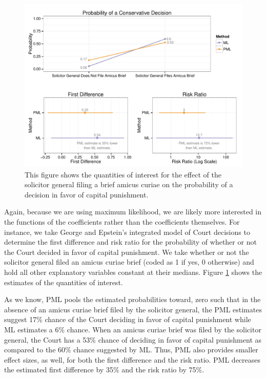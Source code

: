 \documentclass[12pt]{article}
\begin{document}
\begin{figure}[H]
\begin{center}
\includegraphics[width = \textwidth]{figs/ge-qis.pdf}
\caption{This figure shows the quantities of interest for the effect of the solicitor general filing a brief amicus curiae on the probability of a decision in favor of capital punishment.}\label{fig:ge-qis}
\end{center}
\end{figure}

Again, because we are using maximum likelihood, we are likely more interested in the functions of the coefficients rather than the coefficients themselves. 
For instance, we take George and Epstein's integrated model of Court decisions to determine the first difference and risk ratio for the probability of whether or not the Court decided in favor of capital punishment. 
We take whether or not the solicitor general filed an amicus curiae brief (coded as 1 if yes, 0 otherwise) and hold all other explanatory variables constant at their medians. 
Figure \ref{fig:ge-qis} shows the estimates of the quantities of interest.

As we know, PML pools the estimated probabilities toward, zero such that in the absence of an amicus curiae brief filed by the solicitor general, the PML estimates suggest 17\% chance of the Court deciding in favor of capital punishment while ML estimates a 6\% chance. 
When an amicus curiae brief was filed by the solicitor general, the Court has a 53\% chance of deciding in favor of capital punishment as compared to the 60\% chance suggested by ML. 
Thus, PML also provides smaller effect sizes, as well, for both the first difference and the risk ratio. 
PML decreases the estimated first difference by 35\% and the risk ratio by 75\%. 
\end{document}
